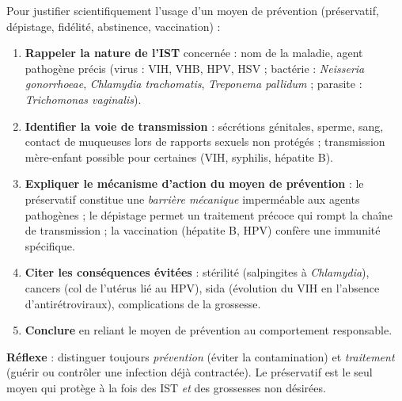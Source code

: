 \documentclass[11pt]{article}
\begin{document}
\begin{methode}
Pour justifier scientifiquement l'usage d'un moyen de prévention (préservatif, dépistage, fidélité, abstinence, vaccination) :
\begin{enumerate}
\item \textbf{Rappeler la nature de l'IST} concernée : nom de la maladie, agent pathogène précis (virus : VIH, VHB, HPV, HSV ; bactérie : \emph{Neisseria gonorrhoeae}, \emph{Chlamydia trachomatis}, \emph{Treponema pallidum} ; parasite : \emph{Trichomonas vaginalis}).
\item \textbf{Identifier la voie de transmission} : sécrétions génitales, sperme, sang, contact de muqueuses lors de rapports sexuels non protégés ; transmission mère-enfant possible pour certaines (VIH, syphilis, hépatite B).
\item \textbf{Expliquer le mécanisme d'action du moyen de prévention} : le préservatif constitue une \emph{barrière mécanique} imperméable aux agents pathogènes ; le dépistage permet un traitement précoce qui rompt la chaîne de transmission ; la vaccination (hépatite B, HPV) confère une immunité spécifique.
\item \textbf{Citer les conséquences évitées} : stérilité (salpingites à \emph{Chlamydia}), cancers (col de l'utérus lié au HPV), sida (évolution du VIH en l'absence d'antirétroviraux), complications de la grossesse.
\item \textbf{Conclure} en reliant le moyen de prévention au comportement responsable.
\end{enumerate}
\textbf{Réflexe} : distinguer toujours \emph{prévention} (éviter la contamination) et \emph{traitement} (guérir ou contrôler une infection déjà contractée). Le préservatif est le seul moyen qui protège à la fois des IST \emph{et} des grossesses non désirées.
\end{methode}
\end{document}
